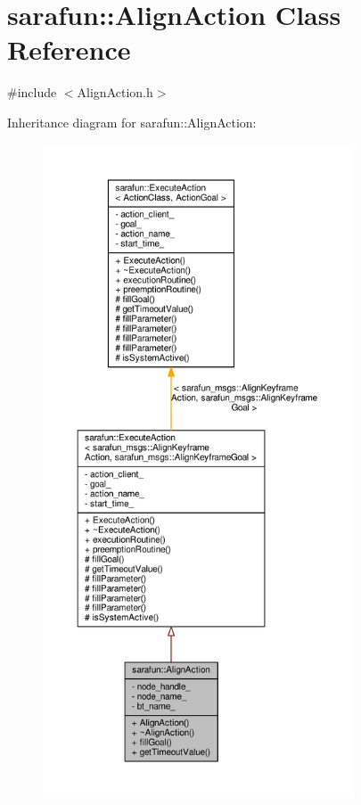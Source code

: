 \hypertarget{classsarafun_1_1AlignAction}{\section{sarafun\-:\-:Align\-Action Class Reference}
\label{classsarafun_1_1AlignAction}
}


{\ttfamily \#include $<$Align\-Action.\-h$>$}



Inheritance diagram for sarafun\-:\-:Align\-Action\-:\nopagebreak
\begin{figure}[H]
\begin{center}
\leavevmode
\includegraphics[height=550pt]{dc/d01/classsarafun_1_1AlignAction__inherit__graph}
\end{center}
\end{figure}


